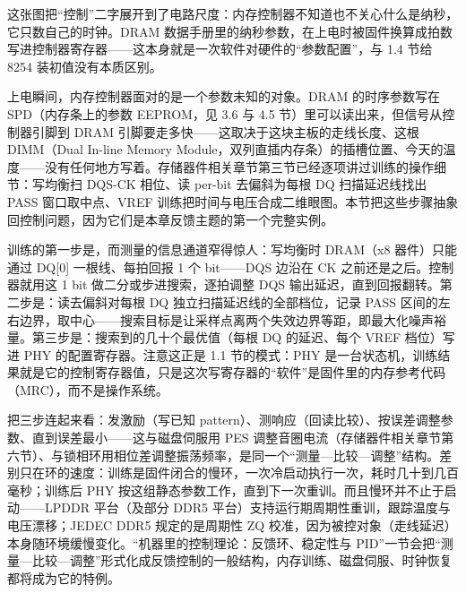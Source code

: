 
这张图把“控制”二字展开到了电路尺度：内存控制器不知道也不关心什么是纳秒，它只数自己的时钟。DRAM 数据手册里的纳秒参数，在上电时被固件换算成拍数写进控制器寄存器——这本身就是一次软件对硬件的“参数配置”，与 1.4 节给 8254 装初值没有本质区别。


上电瞬间，内存控制器面对的是一个参数未知的对象。DRAM 的时序参数写在 SPD（内存条上的参数 EEPROM，见 3.6 与 4.5 节）里可以读出来，但信号从控制器引脚到 DRAM 引脚要走多快——这取决于这块主板的走线长度、这根 DIMM（Dual In-line Memory Module，双列直插内存条）的插槽位置、今天的温度——没有任何地方写着。存储器件相关章节第三节已经逐项讲过训练的操作细节：写均衡扫 DQS-CK 相位、读 per-bit 去偏斜为每根 DQ 扫描延迟线找出 PASS 窗口取中点、VREF 训练把时间与电压合成二维眼图。本节把这些步骤抽象回控制问题，因为它们是本章反馈主题的第一个完整实例。

训练的第一步是，而测量的信息通道窄得惊人：写均衡时 DRAM（x8 器件）只能通过 DQ[0] 一根线、每拍回报 1 个 bit——DQS 边沿在 CK 之前还是之后。控制器就用这 1 bit 做二分或步进搜索，逐拍调整 DQS 输出延迟，直到回报翻转。第二步是：读去偏斜对每根 DQ 独立扫描延迟线的全部档位，记录 PASS 区间的左右边界，取中心——搜索目标是让采样点离两个失效边界等距，即最大化噪声裕量。第三步是：搜索到的几十个最优值（每根 DQ 的延迟、每个 VREF 档位）写进 PHY 的配置寄存器。注意这正是 1.1 节的模式：PHY 是一台状态机，训练结果就是它的控制寄存器值，只是这次写寄存器的“软件”是固件里的内存参考代码（MRC），而不是操作系统。

把三步连起来看：发激励（写已知 pattern）、测响应（回读比较）、按误差调整参数、直到误差最小——这与磁盘伺服用 PES 调整音圈电流（存储器件相关章节第六节）、与锁相环用相位差调整振荡频率，是同一个“测量—比较—调整”结构。差别只在环的速度：训练是固件闭合的慢环，一次冷启动执行一次，耗时几十到几百毫秒；训练后 PHY 按这组静态参数工作，直到下一次重训。而且慢环并不止于启动——LPDDR 平台（及部分 DDR5 平台）支持运行期周期性重训，跟踪温度与电压漂移；JEDEC DDR5 规定的是周期性 ZQ 校准，因为被控对象（走线延迟）本身随环境缓慢变化。“机器里的控制理论：反馈环、稳定性与 PID”一节会把“测量—比较—调整”形式化成反馈控制的一般结构，内存训练、磁盘伺服、时钟恢复都将成为它的特例。
